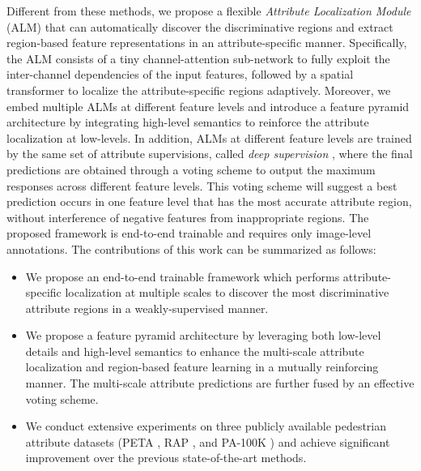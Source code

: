\documentclass[10pt,twocolumn,letterpaper]{article}
\begin{document}
Different from these methods, we propose a flexible \textit{Attribute Localization Module} (ALM) that can automatically discover the discriminative regions and extract region-based feature representations in an attribute-specific manner.
Specifically, the ALM consists of a tiny channel-attention sub-network to fully exploit the inter-channel dependencies of the input features, followed by a spatial transformer \cite{stn} to localize the attribute-specific regions adaptively.
Moreover, we embed multiple ALMs at different feature levels and introduce a feature pyramid architecture by integrating high-level semantics to reinforce the attribute localization at low-levels.
In addition, ALMs at different feature levels are trained by the same set of attribute supervisions, called \textit{deep supervision} \cite{lee2015deeply,wang2018resource}, where the final predictions are obtained through a voting scheme to output the maximum responses across different feature levels.
This voting scheme will suggest a best prediction occurs in one feature level that has the most accurate attribute region, without interference of negative features from inappropriate regions.
The proposed framework is end-to-end trainable and requires only image-level annotations.
The contributions of this work can be summarized as follows:
\begin{itemize}[noitemsep]
  \item We propose an end-to-end trainable framework which performs attribute-specific localization at multiple scales to discover the most discriminative attribute regions in a weakly-supervised manner.
  \item We propose a feature pyramid architecture by leveraging both low-level details and high-level semantics to enhance the multi-scale attribute localization and region-based feature learning in a mutually reinforcing manner. The multi-scale attribute predictions are further fused by an effective voting scheme.
  \item We conduct extensive experiments on three publicly available pedestrian attribute datasets (PETA \cite{deng2014pedestrian}, RAP \cite{rap}, and PA-100K \cite{hpnet}) and achieve significant improvement over the previous state-of-the-art methods.
\end{itemize}
\end{document}
